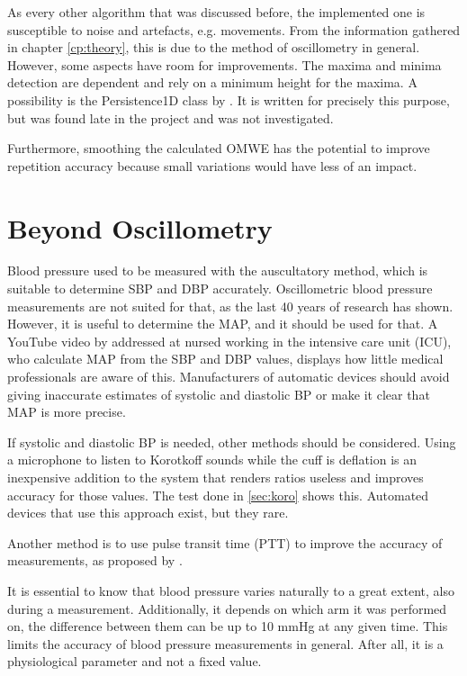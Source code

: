 As every other algorithm that was discussed before, the implemented one is susceptible to noise and artefacts, e.g. movements. From the information gathered in chapter \ref{cp:theory}, this is due to the method of oscillometry in general. However, some aspects have room for improvements. The maxima and minima detection are dependent and rely on a minimum height for the maxima. A possibility is the Persistence1D class by \citet{Weinkauf2020}. It is written for precisely this purpose, but was found late in the project and was not investigated.

Furthermore, smoothing the calculated OMWE has the potential to improve repetition accuracy because small variations would have less of an impact.

\section{Beyond Oscillometry}

Blood pressure used to be measured with the auscultatory method, which is suitable to determine SBP and DBP accurately. Oscillometric blood pressure measurements are not suited for that, as the last 40 years of research has shown. However, it is useful to determine the MAP, and it should be used for that. A YouTube video by \citet{Joe2019} addressed at nursed working in the intensive care unit (ICU), who calculate MAP from the SBP and DBP values, displays how little medical professionals are aware of this. Manufacturers of automatic devices should avoid giving inaccurate estimates of systolic and diastolic BP or make it clear that MAP is more precise.

If systolic and diastolic BP is needed, other methods should be considered. Using a microphone to listen to Korotkoff sounds while the cuff is deflation is an inexpensive addition to the system that renders ratios useless and improves accuracy for those values. The test done in \ref{sec:koro} shows this. Automated devices that use this approach exist, but they rare.

Another method is to use pulse transit time (PTT) to improve the accuracy of measurements, as proposed by \citet{Forouzanfar2015}. 

It is essential to know that blood pressure varies naturally to a great extent, also during a measurement. Additionally, it depends on which arm it was performed on, the difference between them can be up to 10 mmHg at any given time. This limits the accuracy of blood pressure measurements in general. After all, it is a physiological parameter and not a fixed value.

